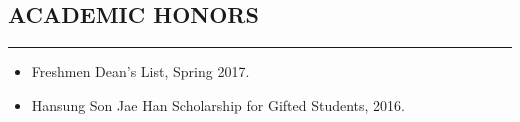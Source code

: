 \documentclass[10pt,a4]{article}
\begin{document}
\begin{small}
%	
%
%	
%
%


\subsection*{ACADEMIC HONORS}
\hrule
\vspace{0.2cm}
\begin{itemize}


\item Freshmen Dean's List, Spring 2017.

\item Hansung Son Jae Han Scholarship for Gifted Students, 2016.

\end{itemize}


\end{small}
\end{document}
